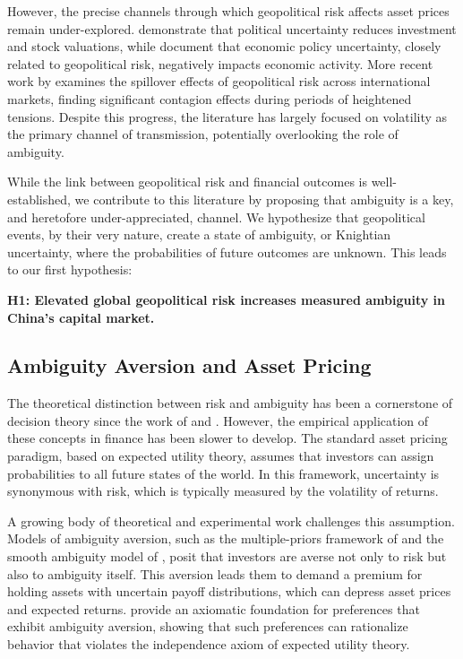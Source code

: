 \documentclass[preprint,12pt,authoryear]{elsarticle}
\begin{document}
However, the precise channels through which geopolitical risk affects asset prices remain under-explored. \citet{pastor2013political} demonstrate that political uncertainty reduces investment and stock valuations, while \citet{baker2016measuring} document that economic policy uncertainty, closely related to geopolitical risk, negatively impacts economic activity. More recent work by \citet{bouoiyour2019geopolitical} examines the spillover effects of geopolitical risk across international markets, finding significant contagion effects during periods of heightened tensions. Despite this progress, the literature has largely focused on volatility as the primary channel of transmission, potentially overlooking the role of ambiguity.

While the link between geopolitical risk and financial outcomes is well-established, we contribute to this literature by proposing that ambiguity is a key, and heretofore under-appreciated, channel. We hypothesize that geopolitical events, by their very nature, create a state of ambiguity, or Knightian uncertainty, where the probabilities of future outcomes are unknown. This leads to our first hypothesis:

\textbf{H1: Elevated global geopolitical risk increases measured ambiguity in China's capital market.}

\subsection{Ambiguity Aversion and Asset Pricing}

The theoretical distinction between risk and ambiguity has been a cornerstone of decision theory since the work of \citet{knight1921risk} and \citet{ellsberg1961risk}. However, the empirical application of these concepts in finance has been slower to develop. The standard asset pricing paradigm, based on expected utility theory, assumes that investors can assign probabilities to all future states of the world. In this framework, uncertainty is synonymous with risk, which is typically measured by the volatility of returns.

A growing body of theoretical and experimental work challenges this assumption. Models of ambiguity aversion, such as the multiple-priors framework of \citet{gilboa1989maxmin} and the smooth ambiguity model of \citet{klibanoff2005smooth}, posit that investors are averse not only to risk but also to ambiguity itself. This aversion leads them to demand a premium for holding assets with uncertain payoff distributions, which can depress asset prices and expected returns. \citet{epstein1999ambiguity} provide an axiomatic foundation for preferences that exhibit ambiguity aversion, showing that such preferences can rationalize behavior that violates the independence axiom of expected utility theory.
\end{document}
